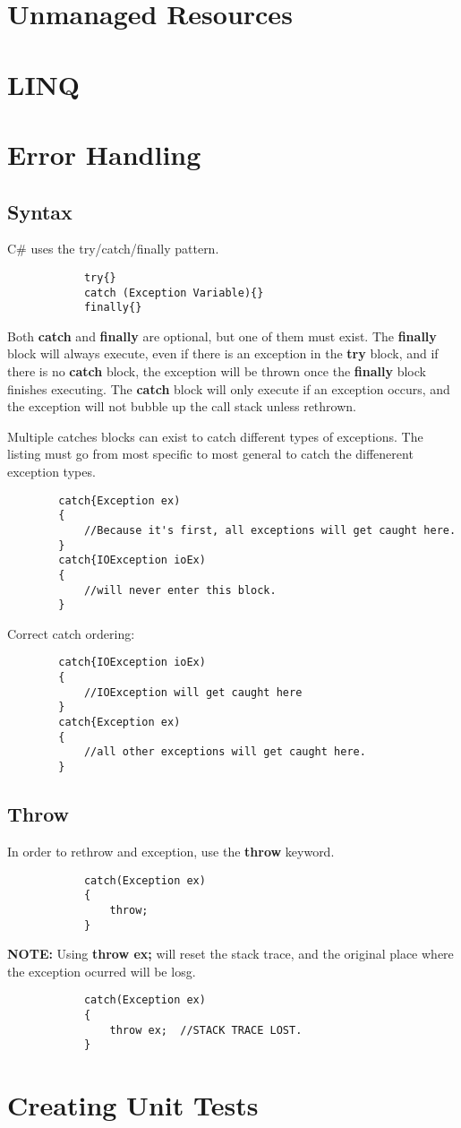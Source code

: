 \documentclass {amsart}
\begin{document}
\section{Unmanaged Resources}

\section{LINQ}

\section{Error Handling}
	\subsection{Syntax}  C\# uses the try/catch/finally pattern.
		\begin{lstlisting}
			try{}
			catch (Exception Variable){}
			finally{}
		\end{lstlisting}
	Both {\bf catch} and {\bf finally} are optional, but one of them must exist.  The {\bf finally} block will always execute, even if there is an exception in the {\bf try} block, and if there is no {\bf catch} block, the exception will be thrown once the {\bf finally} block finishes executing.  The {\bf catch} block will only execute if an exception occurs, and the exception will not bubble up the call stack unless rethrown.  
		
	Multiple catches blocks can exist to catch different types of exceptions.  The listing must go from most specific to most general to catch the diffenerent exception types. 

	\begin{lstlisting}
		catch{Exception ex)
		{
			//Because it's first, all exceptions will get caught here.
		}
		catch{IOException ioEx)
		{
			//will never enter this block. 
		}
	\end{lstlisting}
	
	Correct catch ordering:

	\begin{lstlisting}
		catch{IOException ioEx)
		{
			//IOException will get caught here
		}
		catch{Exception ex)
		{
			//all other exceptions will get caught here.
		}
	\end{lstlisting}
	\subsection{Throw}  In order to rethrow and exception, use the {\bf throw} keyword.  
		\begin{lstlisting}
			catch(Exception ex)
			{
				throw;
			}
		\end{lstlisting}
	{\bf NOTE:} Using {\bf throw ex;} will reset the stack trace, and the original place where the exception ocurred will be losg.
		\begin{lstlisting}
			catch(Exception ex)
			{
				throw ex;  //STACK TRACE LOST.
			}
		\end{lstlisting}
		

\section{Creating Unit Tests}
\end{document}
